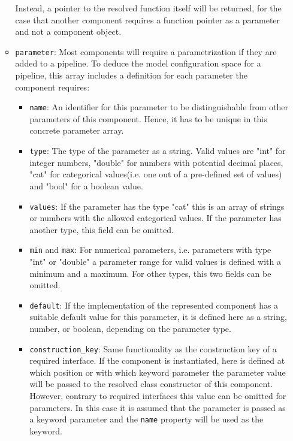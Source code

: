 \begin{itemize}
\begin{itemize}[label=\textbullet]
                Instead, a pointer to the resolved function itself will be returned, for the case that another component requires a function pointer as a parameter and not a component object.
            \item \texttt{parameter}: Most components will require a parametrization if they are added to a pipeline. To deduce the model configuration space for a pipeline, this array includes a definition for each parameter the component requires:
            \begin{itemize}[label=\textbullet]
                \item \texttt{name}: An identifier for this parameter to be distinguishable from other parameters of this component. Hence, it has to be unique in this concrete parameter array.
                \item \texttt{type}: The type of the parameter as a string. Valid values are "int" for integer numbers, "double" for numbers with potential decimal places, "cat" for categorical values(i.e. one out of a pre-defined set of values) and "bool" for a boolean value.
                \item \texttt{values}: If the parameter has the type "cat" this is an array of strings or numbers with the allowed categorical values. If the parameter has another type, this field can be omitted.
                \item \texttt{min} and \texttt{max}: For numerical parameters, i.e. parameters with type "int" or "double" a parameter range for valid values is defined with a minimum and a maximum. For other types, this two fields can be omitted.
                \item \texttt{default}: If the implementation of the represented component has a suitable default value for this parameter, it is defined here as a string, number, or boolean, depending on the parameter type.
                \item \texttt{construction\_key}: Same functionality as the construction key of a required interface.
                    If the component is instantiated, here is defined at which position or with which keyword parameter the parameter value will be passed to the resolved class constructor of this component.
                    However, contrary to required interfaces this value can be omitted for parameters.
                    In this case it is assumed that the parameter is passed as a keyword parameter and the \texttt{name} property will be used as the keyword.
            \end{itemize}
        \end{itemize}
\end{itemize}
